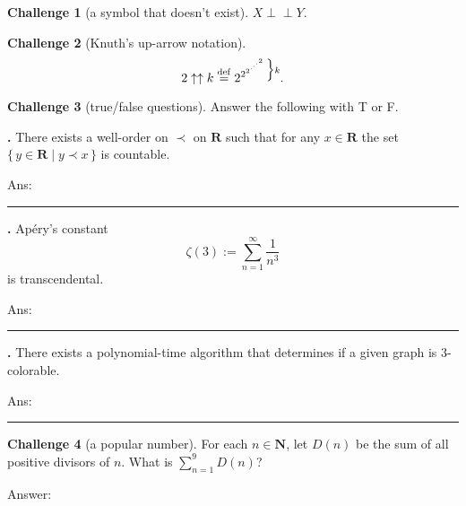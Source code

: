\documentclass[11pt]{amsart}
\theoremstyle{definition}
\newtheorem{challenge}{Challenge}
\newcommand{\N}{\mathbf{N}}
\newcommand{\R}{\mathbf{R}}
\begin{document}
\begin{challenge}[a symbol that doesn't exist]
$X \perp\!\!\!\perp Y$.
\end{challenge}

\begin{challenge}[Knuth's up-arrow notation]
\[
2\uparrow\uparrow k \stackrel{\mathrm{def}}{=}
2^{2^{2^{\cdot^{\cdot^{\cdot^{2}}}}}} \raisebox{7pt}{$\Big\}\scriptstyle k$}.
\]
\end{challenge}

\newlength{\tfanslen}
\newlength{\tfproblen}
\setlength{\tfproblen}{\textwidth}
\addtolength{\tfproblen}{-\tfanslen}
\addtolength{\tfproblen}{-2ex}

\newenvironment{tfprob}{%
\addtocounter{tfcnt}{1}%
\vspace{1em}\begin{minipage}[t]{\tfproblen}{\large \bfseries \thetfcnt.}}{%
\end{minipage}\hspace{2ex}Ans: \rule{6ex}{0.2mm}\vspace{1em}}

\begin{challenge}[true/false questions]
Answer the following with T or F.

\begin{tfprob}
There exists a well-order on $\prec$ on $\R$ such that for any $x \in \R$
the set $\{\,y \in \R \mid y \prec x\,\}$ is countable.
\end{tfprob}

\begin{tfprob}
Ap\'ery's constant
\[ \zeta(3) := \sum_{n=1}^\infty \frac{1}{n^3} \]
is transcendental.
\end{tfprob}

\begin{tfprob}
There exists a polynomial-time algorithm that determines if a given
graph is $3$-colorable.
\end{tfprob}
\end{challenge}

\renewcommand{\thechallenge}{10\protect\footnote{There is no iPhone 9 or
Windows 9. Why should we have one?}}
\begin{challenge}[a popular number]
For each $n \in \N$, let $D(n)$ be the sum of all positive divisors of $n$.
What is $\sum_{n=1}^9 D(n)$?

\hfill Answer: \framebox[2cm]{\rule[-.5cm]{0pt}{1cm}}
\end{challenge}
\end{document}
